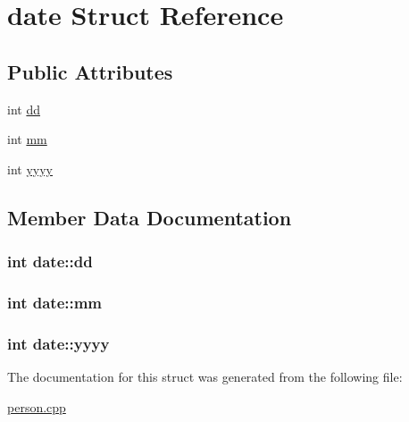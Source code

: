\hypertarget{structdate}{}\section{date Struct Reference}
\label{structdate}
\subsection*{Public Attributes}
\begin{DoxyCompactItemize}
\item 
int \hyperlink{structdate_a76f88239963cde7603622f6527e55a08}{dd}
\item 
int \hyperlink{structdate_ad63f86912f69ef43c342a0d4328431f0}{mm}
\item 
int \hyperlink{structdate_a2abeb95ba2a1a5cdcf1cd3667d9ea3ca}{yyyy}
\end{DoxyCompactItemize}


\subsection{Member Data Documentation}
\subsubsection[{\texorpdfstring{dd}{dd}}]{\setlength{\rightskip}{0pt plus 5cm}int date\+::dd}\hypertarget{structdate_a76f88239963cde7603622f6527e55a08}{}\label{structdate_a76f88239963cde7603622f6527e55a08}
\subsubsection[{\texorpdfstring{mm}{mm}}]{\setlength{\rightskip}{0pt plus 5cm}int date\+::mm}\hypertarget{structdate_ad63f86912f69ef43c342a0d4328431f0}{}\label{structdate_ad63f86912f69ef43c342a0d4328431f0}
\subsubsection[{\texorpdfstring{yyyy}{yyyy}}]{\setlength{\rightskip}{0pt plus 5cm}int date\+::yyyy}\hypertarget{structdate_a2abeb95ba2a1a5cdcf1cd3667d9ea3ca}{}\label{structdate_a2abeb95ba2a1a5cdcf1cd3667d9ea3ca}


The documentation for this struct was generated from the following file\+:\begin{DoxyCompactItemize}
\item 
\hyperlink{person_8cpp}{person.\+cpp}\end{DoxyCompactItemize}
